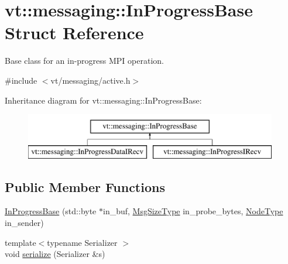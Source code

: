 \hypertarget{structvt_1_1messaging_1_1_in_progress_base}{}\section{vt\+:\+:messaging\+:\+:In\+Progress\+Base Struct Reference}
\label{structvt_1_1messaging_1_1_in_progress_base}


Base class for an in-\/progress M\+PI operation.  




{\ttfamily \#include $<$vt/messaging/active.\+h$>$}

Inheritance diagram for vt\+:\+:messaging\+:\+:In\+Progress\+Base\+:\begin{figure}[H]
\begin{center}
\leavevmode
\includegraphics[height=2.000000cm]{structvt_1_1messaging_1_1_in_progress_base}
\end{center}
\end{figure}
\subsection*{Public Member Functions}
\begin{DoxyCompactItemize}
\item 
\hyperlink{structvt_1_1messaging_1_1_in_progress_base_a0ba75fd3516ed6b29d0d52ca2bdf8477}{In\+Progress\+Base} (std\+::byte $\ast$in\+\_\+buf, \hyperlink{namespacevt_a408e86a8c7c89309b52907dc5a513924}{Msg\+Size\+Type} in\+\_\+probe\+\_\+bytes, \hyperlink{namespacevt_a866da9d0efc19c0a1ce79e9e492f47e2}{Node\+Type} in\+\_\+sender)
\item 
{\footnotesize template$<$typename Serializer $>$ }\\void \hyperlink{structvt_1_1messaging_1_1_in_progress_base_afa9023f2c85ac14ef3b35ac71e8a477e}{serialize} (Serializer \&s)
\end{DoxyCompactItemize}
